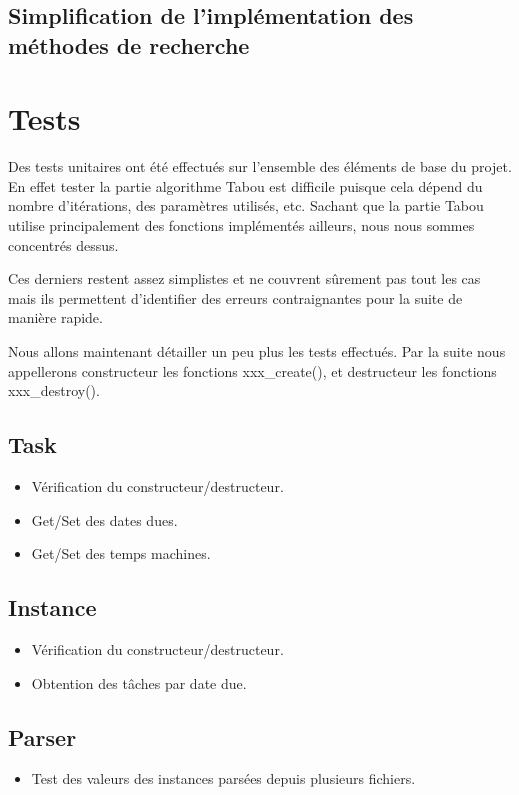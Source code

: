 \documentclass[hideweeklyreports]{polytech/polytech}
\begin{document}
			\subsection{Simplification de l'implémentation des méthodes de recherche}%
		
		\section{Tests}
			Des tests unitaires ont été effectués sur l'ensemble des éléments de base du projet. En effet tester la partie algorithme Tabou est difficile puisque cela dépend du nombre d'itérations, des paramètres utilisés, etc. Sachant que la partie Tabou utilise principalement des fonctions implémentés ailleurs, nous nous sommes concentrés dessus.
			
			Ces derniers restent assez simplistes et ne couvrent sûrement pas tout les cas mais ils permettent d'identifier des erreurs contraignantes pour la suite de manière rapide.
			
			Nous allons maintenant détailler un peu plus les tests effectués. Par la suite nous appellerons constructeur les fonctions xxx\_create(), et destructeur les fonctions xxx\_destroy().
			\subsection{Task}
				\begin{itemize}
					\item Vérification du constructeur/destructeur.
					\item Get/Set des dates dues.
					\item Get/Set des temps machines.
				\end{itemize}
				
			\subsection{Instance}
				\begin{itemize}
					\item Vérification du constructeur/destructeur.
					\item Obtention des tâches par date due.
				\end{itemize}
				
			\subsection{Parser}
				\begin{itemize}
					\item Test des valeurs des instances parsées depuis plusieurs fichiers.
				\end{itemize}
				
\end{document}
